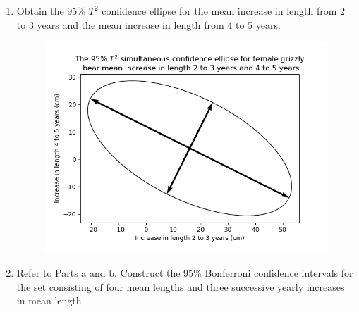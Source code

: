 \begin{enumerate}[label=(\alph*)]
    \[
        \textbf{a}_{i}^{\prime}\bar{\textbf{x}}
        \pm
        \sqrt{
            \frac{(n-1)p}{(n-p)}
            F_{p, n-p}
            \left(\alpha\right)
            }
        \sqrt{
            \frac{
                \textbf{a}_{i}^{\prime}
                \textbf{S}
                \textbf{a}_{i}
                }{
                    n
                }
            }
    \]
    \[
        \begin{NiceArray}{rrrr}
            16.00 \pm \sqrt{72.94} \frac{\sqrt{133.00}}{\sqrt{7}} & \text{contains }\mu_{1} & \text{ or } & -21.23 \leq \mu_{1} \leq 53.23 \\
            13.86 \pm \sqrt{72.94} \frac{\sqrt{128.48}}{\sqrt{7}} & \text{contains }\mu_{1} & \text{ or } & -22.73 \leq \mu_{2} \leq 50.45 \\
            4.00 \pm \sqrt{72.94} \frac{\sqrt{58.33}}{\sqrt{7}} & \text{contains }\mu_{1} & \text{ or } & -20.65 \leq \mu_{3} \leq 28.65
        \end{NiceArray}
    \]

    \item Obtain the 95\% $T^{2}$ confidence ellipse for the mean increase in length from 2 to 3 years and the mean increase in length from 4 to 5 years.
    
    \begin{figure}[H]
        \centering
            \includegraphics[scale=0.75]{./python/chapter-5/Question-5-10-c.png}
    \end{figure}
    
    \item Refer to Parts a and b. Construct the 95\% Bonferroni confidence intervals for the set consisting of four mean lengths and three successive yearly increases in mean length.
    

\end{enumerate}
